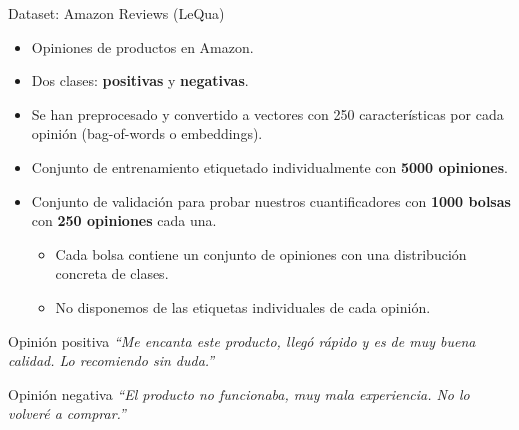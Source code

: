 \documentclass{beamer}
\begin{document}
\begin{frame}{Dataset: Amazon Reviews (LeQua)}
\begin{itemize}
    \item Opiniones de productos en Amazon.
    \item Dos clases: \textbf{positivas} y \textbf{negativas}.
    \item Se han preprocesado y convertido a vectores con 250 características por cada opinión (bag-of-words o embeddings).
    \item Conjunto de entrenamiento etiquetado individualmente con \textbf{5000 opiniones}.
    \item Conjunto de validación para probar nuestros cuantificadores con \textbf{1000 bolsas} con \textbf{250 opiniones} cada una.
    \begin{itemize}
        \item Cada bolsa contiene un conjunto de opiniones con una distribución concreta de clases.
        \item No disponemos de las etiquetas individuales de cada opinión.
    \end{itemize}
\end{itemize}
\begin{block}{Opinión positiva}
    \small
    \emph{“Me encanta este producto, llegó rápido y es de muy buena calidad. Lo recomiendo sin duda.”}
    \end{block}
    
    \begin{block}{Opinión negativa}
    \small
    \emph{“El producto no funcionaba, muy mala experiencia. No lo volveré a comprar.”}
    \end{block}
\end{frame}
\end{document}
